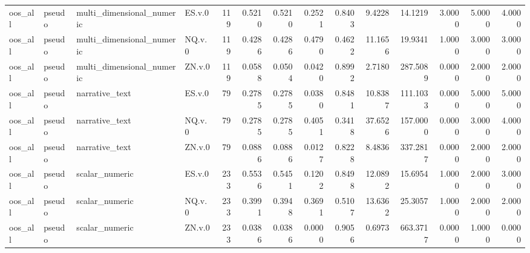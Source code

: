 \begin{tabular}{llllrrrrrrrrrr}
oos_all & pseudo & multi_dimensional_numeric & ES.v.0 & 119 & 0.5210 & 0.5210 & 0.2521 & 0.8403 & 9.4228 & 14.1219 & 3.0000 & 5.0000 & 4.0000 \\
oos_all & pseudo & multi_dimensional_numeric & NQ.v.0 & 119 & 0.4286 & 0.4286 & 0.4790 & 0.4622 & 11.1656 & 19.9341 & 1.0000 & 3.0000 & 3.0000 \\
oos_all & pseudo & multi_dimensional_numeric & ZN.v.0 & 119 & 0.0588 & 0.0504 & 0.0420 & 0.8992 & 2.7180 & 287.5089 & 0.0000 & 2.0000 & 2.0000 \\
oos_all & pseudo & narrative_text & ES.v.0 & 79 & 0.2785 & 0.2785 & 0.0380 & 0.8481 & 10.8387 & 111.1033 & 0.0000 & 5.0000 & 5.0000 \\
oos_all & pseudo & narrative_text & NQ.v.0 & 79 & 0.2785 & 0.2785 & 0.4051 & 0.3418 & 37.6526 & 157.0000 & 0.0000 & 3.0000 & 4.0000 \\
oos_all & pseudo & narrative_text & ZN.v.0 & 79 & 0.0886 & 0.0886 & 0.0127 & 0.8228 & 8.4836 & 337.2817 & 0.0000 & 2.0000 & 2.0000 \\
oos_all & pseudo & scalar_numeric & ES.v.0 & 233 & 0.5536 & 0.5451 & 0.1202 & 0.8498 & 12.0892 & 15.6954 & 1.0000 & 2.0000 & 3.0000 \\
oos_all & pseudo & scalar_numeric & NQ.v.0 & 233 & 0.3991 & 0.3948 & 0.3691 & 0.5107 & 13.6362 & 25.3057 & 1.0000 & 2.0000 & 2.0000 \\
oos_all & pseudo & scalar_numeric & ZN.v.0 & 233 & 0.0386 & 0.0386 & 0.0000 & 0.9056 & 0.6973 & 663.3717 & 0.0000 & 1.0000 & 0.0000 \\
\bottomrule
\end{tabular}
